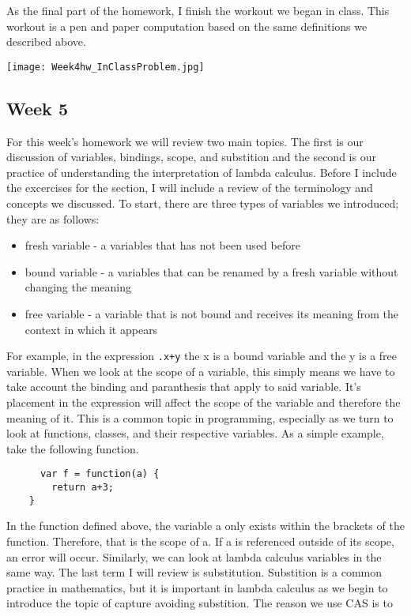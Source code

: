 \documentclass{article}
\theoremstyle{theorem}
\theoremstyle{definition}
\theoremstyle{remark}
\begin{document}
As the final part of the homework, I finish the workout we began in class. This workout is a pen and paper computation based on the same definitions we described above. 
\begin{center}
  \texttt{[image: Week4hw\_InClassProblem.jpg]}
\end{center}

\subsection{Week 5}
For this week's homework we will review two main topics. The first is our discussion of variables, bindings, scope, and substition and the second is our practice of understanding the interpretation of lambda calculus. 
Before I include the excercises for the section, I will include a review of the terminology and concepts we discussed. To start, there are three types of variables we introduced; they are as follows:
\begin{itemize}
  \item fresh variable - a variables that has not been used before 
  \item bound variable - a variables that can be renamed by a fresh variable without changing the meaning
  \item free variable - a variable that is not bound and receives its meaning from the context in which it appears 
\end{itemize}
For example, in the expression \texttt{\x.x+y} the x is a bound variable and the y is a free variable. When we look at the scope of a variable, this simply means we have to take account the binding and paranthesis 
that apply to said variable. It's placement in the expression will affect the 
scope of the variable and therefore the meaning of it. This is a common topic in programming, especially as we turn to look at functions, classes, and their
respective variables. As a simple example, take the following function. 
\begin{center} 
  \begin{verbatim}
      var f = function(a) {
        return a+3;     
    }
  \end{verbatim}
\end{center}
In the function defined above, the variable a only exists within the brackets of the function. Therefore, that is the scope of a. If a is referenced outside of its scope, an error will occur. Similarly, we can look at lambda calculus variables 
in the same way. The last term I will review is substitution. Substition is a common practice in mathematics, but it is important in lambda calculus as we begin to introduce the topic of capture avoiding substition. The reason we use CAS is to
\end{document}
